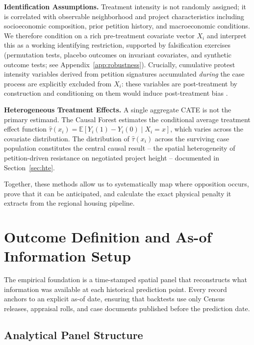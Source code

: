 \documentclass[twoside,11pt]{article}
\begin{document}
\textbf{Identification Assumptions.} Treatment intensity is not randomly assigned; it is correlated with observable neighborhood and project characteristics including socioeconomic composition, prior petition history, and macroeconomic conditions. We therefore condition on a rich pre-treatment covariate vector $X_i$ and interpret this as a working identifying restriction, supported by falsification exercises (permutation tests, placebo outcomes on invariant covariates, and synthetic outcome tests; see Appendix~\ref{app:robustness}). Crucially, cumulative protest intensity variables derived from petition signatures accumulated \emph{during} the case process are explicitly excluded from $X_i$: these variables are post-treatment by construction and conditioning on them would induce post-treatment bias \citep{angrist1996identification}.

\textbf{Heterogeneous Treatment Effects.} A single aggregate CATE is not the primary estimand. The Causal Forest estimates the conditional average treatment effect function $\hat{\tau}(x_i) = \mathbb{E}[Y_i(1) - Y_i(0) \mid X_i = x]$, which varies across the covariate distribution. The distribution of $\hat{\tau}(x_i)$ across the surviving case population constitutes the central causal result -- the spatial heterogeneity of petition-driven resistance on negotiated project height -- documented in Section~\ref{sec:hte}.

Together, these methods allow us to systematically map where opposition occurs, prove that it can be anticipated, and calculate the exact physical penalty it extracts from the regional housing pipeline.

\section{Outcome Definition and As-of Information Setup}

The empirical foundation is a time-stamped spatial panel that reconstructs what information was available at each historical prediction point. Every record anchors to an explicit as-of date, ensuring that backtests use only Census releases, appraisal rolls, and case documents published before the prediction date.

\subsection{Analytical Panel Structure}
\end{document}
